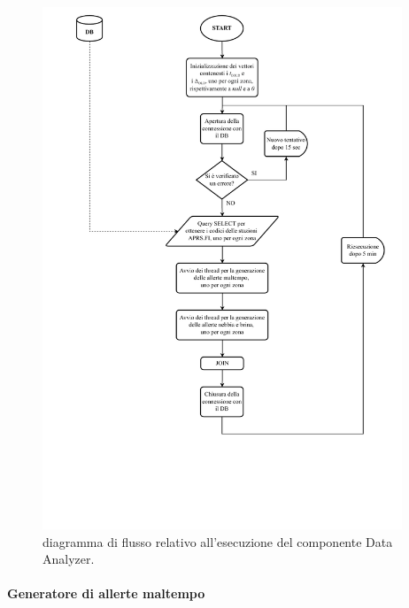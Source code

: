 \begin{figure}[h!]
	\centering
	\includegraphics[height=590px]{./Iterazione 3/OtherFiles/FC - Data analyzer}
	\caption{diagramma di flusso relativo all'esecuzione del componente Data Analyzer.}
	\label{fig:DAFlowChart}
\end{figure}

\clearpage

\paragraph{Generatore di allerte maltempo} 

